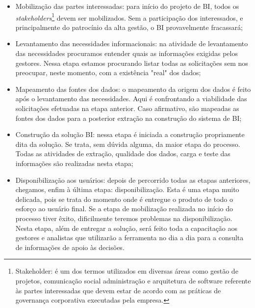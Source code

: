 \begin{itemize}

    \item Mobiliza\c{c}\~{a}o das partes interessadas: para in\'{i}cio do projeto de BI, todos os \textit{stakeholders}\footnote{Stakeholder: \'{e} um dos termos utilizados em diversas \'{a}reas como gest\~{a}o de projetos, comunica\c{c}\~{a}o social administra\c{c}\~{a}o e arquitetura de software referente \`{a}s partes interessadas que devem estar de acordo com as pr\'{a}ticas de governan\c{c}a corporativa executadas pela empresa.} devem ser mobilizados. Sem a participa\c{c}\~{a}o dos interessados, e principalmente do patroc\'{i}nio da alta gest\~{a}o, o BI provavelmente fracassar\'{a};
    
    \item Levantamento das necessidades informacionais: na atividade de levantamento das necessidades procuramos entender quais as informa\c{c}\~{o}es exigidas pelos gestores. Nessa etapa estamos procurando listar todas as solicita\c{c}\~{o}es sem nos preocupar, neste momento, com a exist\^{e}ncia "real" dos dados;
    
    \item Mapeamento das fontes dos dados: o mapeamento da origem dos dados \'{e} feito ap\'{o}s o levantamento das necessidades. Aqui \'{e} confrontando a viabilidade das solicita\c{c}\~{o}es efetuadas na etapa anterior. Caso afirmativo, s\~{a}o mapeadas as fontes dos dados para a posterior extra\c{c}\~{a}o na constru\c{c}\~{a}o do sistema de BI;
    
    \item Constru\c{c}\~{a}o da solu\c{c}\~{a}o BI: nessa etapa \'{e} iniciada a constru\c{c}\~{a}o propriamente dita da solu\c{c}\~{a}o. Se trata, sem dúvida alguma, da maior etapa do processo. Todas as atividades de extra\c{c}\~{a}o, qualidade dos dados, carga e teste das informa\c{c}\~{o}es s\~{a}o realizadas nesta etapa;
    
    \item Disponibiliza\c{c}\~{a}o aos usu\'{a}rios: depois de percorrido todas as etapas anteriores, chegamos, enfim \`{a} última etapa: disponibiliza\c{c}\~{a}o. Esta \'{e} uma etapa muito delicada, pois se trata do momento onde \'{e} entregue o produto de todo o esfor\c{c}o ao usu\'{a}rio final. Se a etapa de mobiliza\c{c}\~{a}o realizada no in\'{i}cio do processo tiver \^{e}xito, dificilmente teremos problemas na disponibiliza\c{c}\~{a}o. Nesta etapa, al\'{e}m de entregar a solu\c{c}\~{a}o, ser\'{a} feito toda a capacita\c{c}\~{a}o aos gestores e analistas que utilizar\~{a}o a ferramenta no dia a dia para a consulta de informa\c{c}\~{o}es de apoio \`{a}s decis\~{o}es.

\end{itemize}

